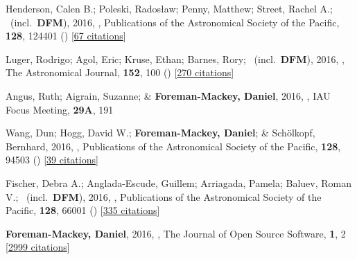 \item[{\color{numcolor}\scriptsize22}] Henderson, Calen B.; Poleski, Rados{\l}aw; Penny, Matthew; Street, Rachel A.; \etal\ (incl.\ \textbf{DFM}), 2016, , Publications of the Astronomical Society of the Pacific, \textbf{128}, 124401 () [\href{https://ui.adsabs.harvard.edu/abs/2016PASP..128l4401H}{67 citations}]

\item[{\color{numcolor}\scriptsize21}] Luger, Rodrigo; Agol, Eric; Kruse, Ethan; Barnes, Rory; \etal\ (incl.\ \textbf{DFM}), 2016, , The Astronomical Journal, \textbf{152}, 100 () [\href{https://ui.adsabs.harvard.edu/abs/2016AJ....152..100L}{270 citations}]

\item[{\color{numcolor}\scriptsize20}] Angus, Ruth; Aigrain, Suzanne; \& \textbf{Foreman-Mackey, Daniel}, 2016, , IAU Focus Meeting, \textbf{29A}, 191

\item[{\color{numcolor}\scriptsize19}] Wang, Dun; Hogg, David W.; \textbf{Foreman-Mackey, Daniel}; \& Sch{\"o}lkopf, Bernhard, 2016, , Publications of the Astronomical Society of the Pacific, \textbf{128}, 94503 () [\href{https://ui.adsabs.harvard.edu/abs/2016PASP..128i4503W}{39 citations}]

\item[{\color{numcolor}\scriptsize18}] Fischer, Debra A.; Anglada-Escude, Guillem; Arriagada, Pamela; Baluev, Roman V.; \etal\ (incl.\ \textbf{DFM}), 2016, , Publications of the Astronomical Society of the Pacific, \textbf{128}, 66001 () [\href{https://ui.adsabs.harvard.edu/abs/2016PASP..128f6001F}{335 citations}]

\item[{\color{numcolor}\scriptsize17}] \textbf{Foreman-Mackey, Daniel}, 2016, , The Journal of Open Source Software, \textbf{1}, 2 [\href{https://scholar.google.com/scholar?cites=1835087844145558435,17325274697099535179,14220488595059618709,12820425635803494730,7284810048757141243,17415935839493019063}{2999 citations}]

